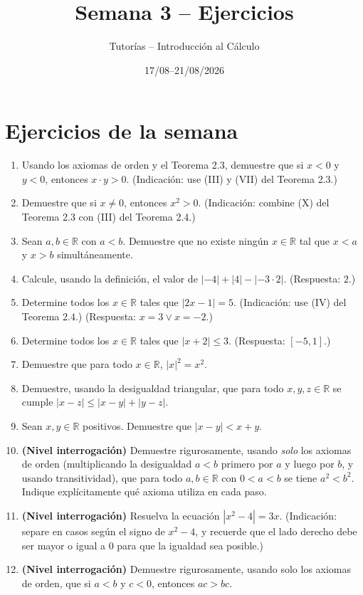 \documentclass[11pt]{article}
\title{Semana 3 -- Ejercicios}
\author{Tutorías -- Introducción al Cálculo}
\date{17/08--21/08/2026}
\begin{document}
\maketitle

\section{Ejercicios de la semana}

\begin{enumerate}[label=\arabic*.]
  \item Usando los axiomas de orden y el Teorema 2.3, demuestre que si $x<0$ y $y<0$, entonces
  $x\cdot y>0$. (Indicación: use (III) y (VII) del Teorema 2.3.)

  \item Demuestre que si $x\neq 0$, entonces $x^2>0$. (Indicación: combine (X) del Teorema 2.3 con
  (III) del Teorema 2.4.)

  \item Sean $a,b\in\mathbb{R}$ con $a<b$. Demuestre que no existe ningún $x\in\mathbb{R}$ tal que
  $x<a$ y $x>b$ simultáneamente.

  \item Calcule, usando la definición, el valor de $|-4|+|4|-|{-3}\cdot 2|$. (Respuesta: $2$.)

  \item Determine todos los $x\in\mathbb{R}$ tales que $|2x-1|=5$. (Indicación: use (IV) del
  Teorema 2.4.) (Respuesta: $x=3 \lor x=-2$.)

  \item Determine todos los $x\in\mathbb{R}$ tales que $|x+2| \le 3$. (Respuesta: $[-5,1]$.)

  \item Demuestre que para todo $x\in\mathbb{R}$, $|x|^2=x^2$.

  \item Demuestre, usando la desigualdad triangular, que para todo $x,y,z\in\mathbb{R}$ se cumple
  $|x-z| \le |x-y|+|y-z|$.

  \item Sean $x,y\in\mathbb{R}$ positivos. Demuestre que $|x-y| < x+y$.

  \item \textbf{(Nivel interrogación)} Demuestre rigurosamente, usando \emph{solo} los axiomas de
  orden (multiplicando la desigualdad $a<b$ primero por $a$ y luego por $b$, y usando
  transitividad), que para todo $a,b\in\mathbb{R}$ con $0<a<b$ se tiene $a^2<b^2$. Indique
  explícitamente qué axioma utiliza en cada paso.

  \item \textbf{(Nivel interrogación)} Resuelva la ecuación $|x^2-4| = 3x$. (Indicación: separe en
  casos según el signo de $x^2-4$, y recuerde que el lado derecho debe ser mayor o igual a $0$
  para que la igualdad sea posible.)

  \item \textbf{(Nivel interrogación)} Demuestre rigurosamente, usando solo los axiomas de orden,
  que si $a<b$ y $c<0$, entonces $ac>bc$.
\end{enumerate}
\end{document}
